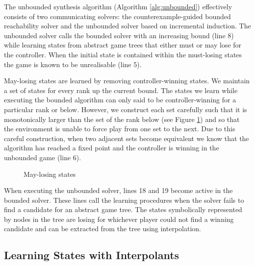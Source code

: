 \documentclass{llncs}
\begin{document}
The unbounded synthesis algorithm (Algorithm \ref{alg:unbounded}) effectively
consists of two communicating solvers: the counterexample-guided bounded
reachability solver and the unbounded solver based on incremental induction.
The unbounded solver calls the bounded solver with an increasing bound (line 8)
while learning states from abstract game trees that either must or may lose for
the controller. When the initial state is contained within the must-losing
states the game is known to be unrealisable (line 5).

May-losing states are learned by removing controller-winning states. We
maintain a set of states for every rank up the current bound. The states we
learn while executing the bounded algorithm can only said to be
controller-winning for a particular rank or below. However, we construct each
set carefully such that it is monotonically larger than the set of the rank
below (see Figure \ref{fig:maylosing}) and so that the environment is unable to
force play from one set to the next. Due to this careful construction, when two
adjacent sets become equivalent we know that the algorithm has reached a fixed
point and the controller is winning in the unbounded game (line 6).

\begin{figure}
    \centering
    \caption{May-losing states}
    \label{fig:maylosing}
\end{figure}


When executing the unbounded solver, lines 18 and 19 become active in the
bounded solver. These lines call the learning procedures when the solver fails
to find a candidate for an abstract game tree. The states symbolically
represented by nodes in the tree are losing for whichever player could not find
a winning candidate and can be extracted from the tree using interpolation.

\subsection{Learning States with Interpolants}
\end{document}
